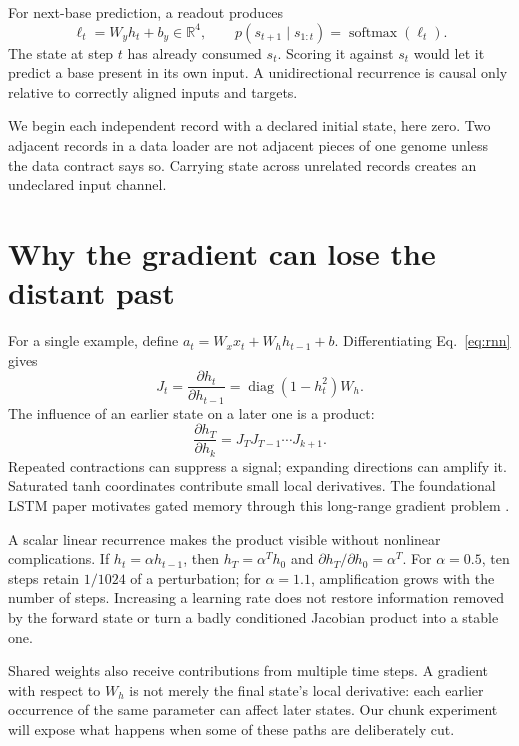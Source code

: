 For next-base prediction, a readout produces
\begin{equation}
\ell_t=W_yh_t+b_y\in\mathbb R^4,\qquad
p(s_{t+1}\mid s_{1:t})=\operatorname{softmax}(\ell_t).
\end{equation}
The state at step $t$ has already consumed $s_t$. Scoring it against
$s_t$ would let it predict a base present in its own input. A unidirectional
recurrence is causal only relative to correctly aligned inputs and targets.

We begin each independent record with a declared initial state, here zero.
Two adjacent records in a data loader are not adjacent pieces of one genome
unless the data contract says so. Carrying state across unrelated records
creates an undeclared input channel.

\section{Why the gradient can lose the distant past}

For a single example, define
$a_t=W_xx_t+W_hh_{t-1}+b$. Differentiating Eq.~\ref{eq:rnn} gives
\begin{equation}
J_t=\frac{\partial h_t}{\partial h_{t-1}}
=\operatorname{diag}(1-h_t^2)W_h.
\end{equation}
The influence of an earlier state on a later one is a product:
\begin{equation}
\frac{\partial h_T}{\partial h_k}
=J_TJ_{T-1}\cdots J_{k+1}.
\label{eq:jacobian-product}
\end{equation}
Repeated contractions can suppress a signal; expanding directions can
amplify it. Saturated tanh coordinates contribute small local derivatives.
The foundational LSTM paper motivates gated memory through this
long-range gradient problem \cite{lstm-original}.

A scalar linear recurrence makes the product visible without nonlinear
complications. If $h_t=\alpha h_{t-1}$, then
$h_T=\alpha^T h_0$ and $\partial h_T/\partial h_0=\alpha^T$.
For $\alpha=0.5$, ten steps retain $1/1024$ of a perturbation; for
$\alpha=1.1$, amplification grows with the number of steps.
Increasing a learning rate does not restore information removed by the
forward state or turn a badly conditioned Jacobian product into a stable one.

Shared weights also receive contributions from multiple time steps.
A gradient with respect to $W_h$ is not merely the final state's local
derivative: each earlier occurrence of the same parameter can affect later
states. Our chunk experiment will expose what happens when some of these
paths are deliberately cut.

